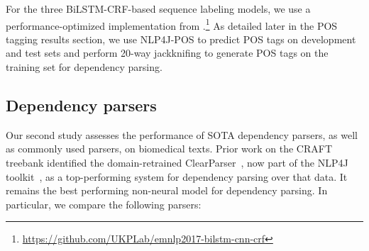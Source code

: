 \documentclass[twocolumn,hyperref]{bmcart}\pdfoutput=1
\begin{document}
For the three BiLSTM-CRF-based sequence labeling models, we use a performance-optimized implementation from \cite{reimers-gurevych:2017:EMNLP2017}.\footnote{\url{https://github.com/UKPLab/emnlp2017-bilstm-cnn-crf}}
As detailed later in the POS tagging results section,  
we use NLP4J-POS to predict POS tags on development and test sets and perform 20-way jackknifing \cite{koo-carreras-collins:2008:ACLMain} to generate POS tags on the training set for dependency parsing.  

\subsection*{Dependency parsers}

Our second study assesses the performance of SOTA dependency parsers, as well as commonly used parsers, on biomedical texts. 
Prior work on the CRAFT treebank identified the domain-retrained ClearParser~\cite{choi2009k}, now part of the NLP4J toolkit~\cite{choi-tetreault-stent:2015:ACL-IJCNLP}, as a top-performing system for dependency parsing over that data. It remains the best performing non-neural model for dependency parsing.
 In particular, we compare the following  parsers:
\end{document}
